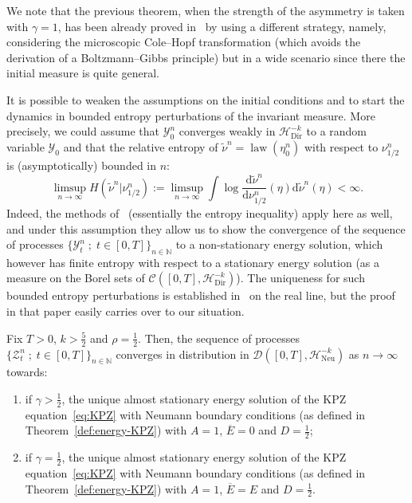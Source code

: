 \documentclass[AHL,Unicode,longabstracts]{cedram}
\DeclareMathOperator{\law}{law}
\newcommand{\bb}[1]{{\mathbb #1}}
\newcommand{\mc}[1]{{\mathcal #1}}
\renewcommand{\mc}[1]{{\mathcal #1}}
\renewcommand{\bar}{\overline}
\renewcommand{\tilde}{\widetilde}
\newcommand*{\dd}{\mathrm{d}}
\begin{document}
\begin{rema}
We note that the previous theorem, when the strength of the asymmetry is taken with $\gamma =1$, has been already proved in~\cite{GLM} by using a different strategy, namely, considering the microscopic Cole--Hopf transformation (which avoids the derivation of a Boltzmann--Gibbs principle) but in a wide scenario since there the initial measure is quite general.
\end{rema}

\begin{rema}\label{rmk:stationary}
It is possible to weaken the assumptions on the initial conditions and to start the dynamics in bounded entropy perturbations of the invariant measure. More precisely, we could assume that $\mc Y^n_0$ converges weakly in $\mc H_{\mathrm{Dir}}^{-k}$ to a random variable $\mc Y_0$ and that the relative entropy of $\tilde \nu^n = \law(\mc \eta^n_0)$ with respect to $\nu^n_{1/2}$ is (asymptotically) bounded in $n$:
\[
\limsup_{n\to\infty} H(\tilde \nu^n | \nu^n_{1/2}) := \limsup_{n\to\infty} \int \log \frac{\dd \tilde \nu^n}{\dd \nu^n_{1/2}}(\eta) \dd\tilde \nu^n(\eta) < \infty.
\]
Indeed, the methods of~\cite{GJS} (essentially the entropy inequality) apply here as well, and under this assumption they allow us to show the convergence of the sequence of processes $\{\mc Y^n_t \; ; \; t \in [0,T]\}_{n\in\bb N}$ to a non-stationary energy solution, which however has finite entropy with respect to a stationary energy solution (as a measure on the Borel sets of $\mc C([0,T], \mc H_{\mathrm{Dir}}^{-k})$). The uniqueness for such bounded entropy perturbations is established in~\cite{Gubinelli2017} on the real line, but the proof in that paper easily carries over to our situation.
\end{rema}

\begin{theo} \label{theo:convheight}
Fix $T>0$, $k>\frac52$ and $\rho=\frac12$.
%
Then, the sequence of processes $\{\mc Z^n_t\; ;\; t \in [0,T]\}_{n\in{\bb N}}$ converges in distribution in $\mc D([0,T], \mc H_{\mathrm{Neu}}^{-k})$ as $n\to\infty$ towards:
\begin{enumerate}
\item \label{3.20.1} if $\gamma > \frac12$, the unique almost stationary energy solution of the KPZ equation~\eqref{eq:KPZ} with Neumann boundary conditions (as defined in Theorem~\ref{def:energy-KPZ}) with $A=1$, $\bar E=0$ and $D=\frac12$;
\item \label{3.20.2} if $\gamma=\frac12$, the unique almost stationary energy solution of the KPZ equation~\eqref{eq:KPZ} with Neumann boundary conditions (as defined in Theorem~\ref{def:energy-KPZ}) with $A=1$, $\bar E = E$ and $D=\frac12$.
\end{enumerate}
\end{theo}
\end{document}
